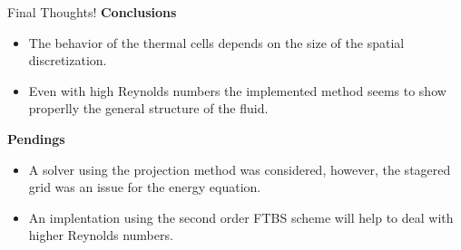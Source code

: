 \documentclass[final]{beamer}
\newlength{\onecolwid}
\begin{document}
\begin{frame}[t]
\begin{columns}[t]
\begin{column}{\onecolwid}
	\vspace{-2em}
\begin{alertblock}{Final Thoughts!}
\textbf{Conclusions}
\begin{itemize}
\item The behavior of the thermal cells depends on the size of the spatial discretization.
\item Even with high Reynolds numbers the implemented method seems to show properlly the general structure of the fluid.
\end{itemize}
\textbf{Pendings}
\begin{itemize}
\item A solver using the projection method was considered, however, the stagered grid was an issue for the energy equation.
\item An implentation using the second order FTBS scheme will help to deal with higher Reynolds numbers.
\end{itemize}

\end{alertblock}

\end{column} %

\end{columns} %

\end{frame} %
\end{document}

